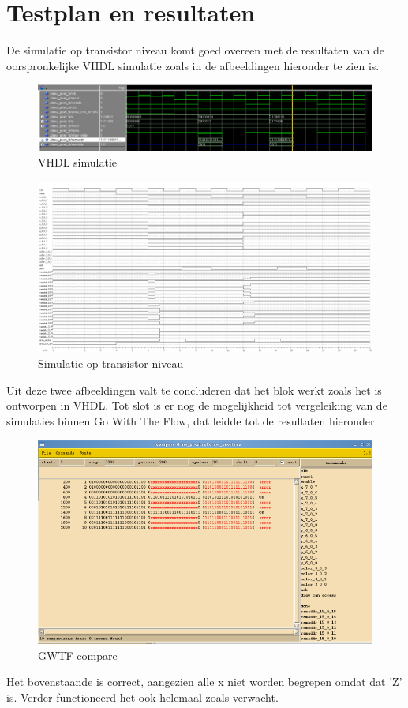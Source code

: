 \documentclass{scrreprt} %
\begin{document}
\section{Testplan en resultaten}
 De simulatie op transistor niveau komt goed overeen met de resultaten van de oorspronkelijke VHDL simulatie zoals in de afbeeldingen hieronder te zien is.
\begin{figure} [h!]
\includegraphics [scale= 0.3] {inputfiles/dp_sim}
\caption{VHDL simulatie}
\label{Th1}
\end{figure}
\begin{figure} [h!]
\includegraphics [scale= 0.3] {inputfiles/dp_sw_lev}
\caption{Simulatie op transistor niveau}
\label{Th1}
\end{figure}
Uit deze twee afbeeldingen valt te concluderen dat het blok werkt zoals het is ontworpen in VHDL. Tot slot is er nog de mogelijkheid tot vergeleiking van de simulaties binnen Go With The Flow, dat leidde tot de resultaten hieronder.
\begin{figure} [h!]
\includegraphics [scale= 0.3] {inputfiles/dp_comp}
\caption{GWTF compare}
\label{Th1}
\end{figure}
Het bovenstaande is correct, aangezien alle x niet worden begrepen omdat dat 'Z' is. Verder functioneerd het ook helemaal zoals verwacht.
\end{document}
